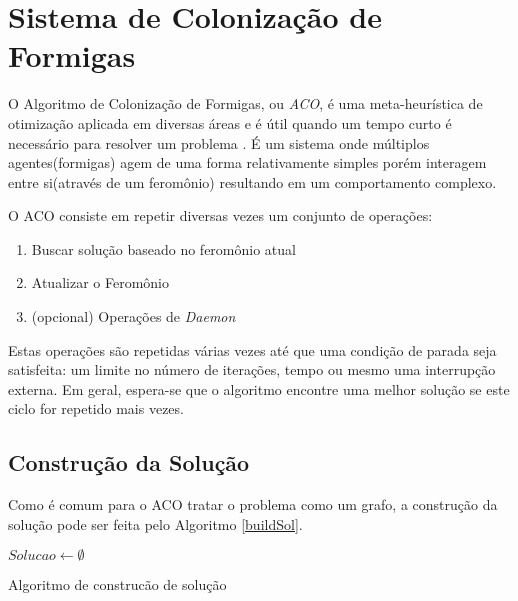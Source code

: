 \section{Sistema de Colonização de Formigas}
O Algoritmo de Colonização de Formigas, ou \textit{ACO}, é uma meta-heurística de otimização aplicada em diversas áreas e é útil quando um tempo curto é necessário para resolver um problema \cite{acomkp}.  É um sistema onde múltiplos agentes(formigas) agem de uma forma relativamente simples porém interagem entre si(através de um feromônio) resultando em um comportamento complexo.

O ACO consiste em repetir diversas vezes um conjunto de operações:
\begin{enumerate}
	\item Buscar solução baseado no feromônio atual
	\item Atualizar o Feromônio
	\item (opcional) Operações de \textit{Daemon}
\end{enumerate}

Estas operações são repetidas várias vezes até que uma condição de parada seja satisfeita: um limite no número de iterações, tempo ou mesmo uma interrupção externa. Em geral, espera-se que o algoritmo encontre uma melhor solução se este ciclo for repetido mais vezes.

\subsection{Construção da Solução}
Como é comum para o ACO tratar o problema como um grafo, a construção da solução pode ser feita pelo Algoritmo \ref{buildSol}.

\begin{algorithm}[hb]
	$Solucao \gets \emptyset$\;

	\caption{Algoritmo de construcão de solução}
	\label{buildSol}
\end{algorithm}

